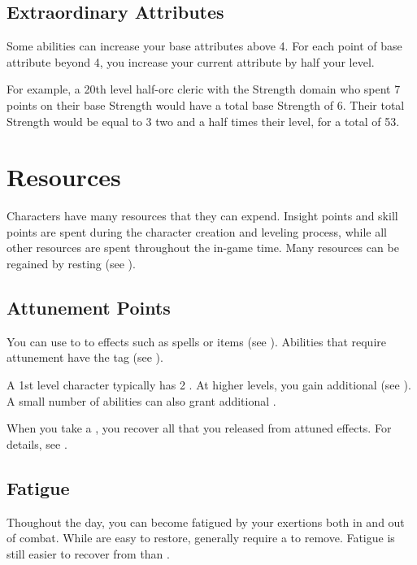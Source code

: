    \subsection{Extraordinary Attributes}
        Some abilities can increase your base attributes above 4.
        For each point of base attribute beyond 4, you increase your current attribute by half your level.

        For example, a 20th level half-orc cleric with the Strength domain who spent 7 points on their base Strength would have a total base Strength of 6.
        Their total Strength would be equal to 3 \add two and a half times their level, for a total of 53.

\section{Resources}\label{Resources}

    Characters have many resources that they can expend.
    Insight points and skill points are spent during the character creation and leveling process, while all other resources are spent throughout the in-game time.
    Many resources can be regained by resting (see ).

    \subsection{Attunement Points}\label{Attunement Points}
        You can use  to  to effects such as spells or items (see ).
        Abilities that require attunement have the  tag (see ).

        A 1st level character typically has 2 .
        At higher levels, you gain additional  (see ).
        A small number of abilities can also grant additional .

        When you take a , you recover all  that you released from attuned effects.
        For details, see .

    \subsection{Fatigue}\label{Fatigue}
        Thoughout the day, you can become fatigued by your exertions both in and out of combat.
        While  are easy to restore,  generally require a  to remove.
        Fatigue is still easier to recover from than .

